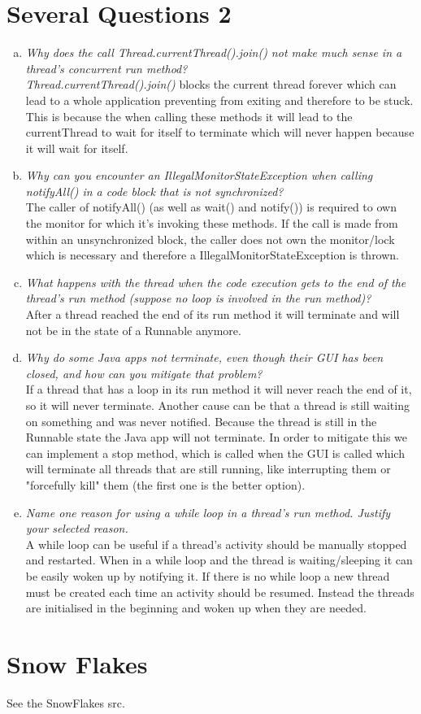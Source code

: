 \documentclass{report}
\begin{document}
	\section{Several Questions 2}
	\startsection
		\begin{enumerate}[a)]
			\item \textit{Why does the call Thread.currentThread().join() not make much sense in a thread’s concurrent run
method?} \\
			\textit{Thread.currentThread().join()} blocks the current thread forever which can lead to a whole application preventing from exiting and therefore to be stuck. This is because the when calling these methods it will lead to the currentThread to wait for itself to terminate which will never happen because it will wait for itself.
			\item \textit{Why can you encounter an IllegalMonitorStateException when calling notifyAll() in a code block
that is not synchronized?} \\
			The caller of notifyAll() (as well as wait() and notify()) is required to own the monitor for which it's invoking these methods. If the call is made from within an unsynchronized block, the caller does not own the monitor/lock which is necessary and therefore a IllegalMonitorStateException is thrown.
			\item \textit{What happens with the thread when the code execution gets to the end of the thread’s run method
(suppose no loop is involved in the run method)?} \\
			After a thread reached the end of its run method it will terminate and will not be in the state of a Runnable anymore.
			\item \textit{Why do some Java apps not terminate, even though their GUI has been closed, and how can you
mitigate that problem?} \\
			If a thread that has a loop in its run method it will never reach the end of it, so it will never terminate. Another cause can be that a thread is still waiting on something and was never notified. Because the thread is still in the Runnable state the Java app will not terminate. In order to mitigate this we can implement a stop method, which is called when the GUI is called which will terminate all threads that are still running, like interrupting them or "forcefully kill" them (the first one is the better option).
			\item \textit{Name one reason for using a while loop in a thread’s run method. Justify your selected reason.} \\
			A while loop can be useful if a thread's activity should be manually stopped and restarted. When in a while loop and the thread is waiting/sleeping it can be easily woken up by notifying it. If there is no while loop a new thread must be created each time an activity should be resumed. Instead the threads are initialised in the beginning and woken up when they are needed.
		\end{enumerate}
	\closesection
	
	\section{Snow Flakes}
	\startsection
		See the SnowFlakes src.
	\closesection
\end{document}
